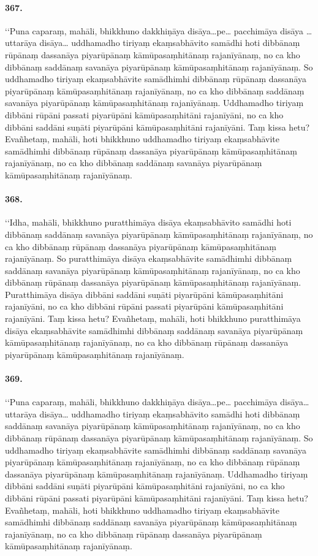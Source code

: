 \paragraph{367.} ‘‘Puna caparaṃ, mahāli, bhikkhuno dakkhiṇāya disāya…pe… pacchimāya disāya … uttarāya disāya… uddhamadho tiriyaṃ ekaṃsabhāvito samādhi hoti dibbānaṃ rūpānaṃ dassanāya piyarūpānaṃ kāmūpasaṃhitānaṃ rajanīyānaṃ, no ca kho dibbānaṃ saddānaṃ savanāya piyarūpānaṃ kāmūpasaṃhitānaṃ rajanīyānaṃ. So uddhamadho tiriyaṃ ekaṃsabhāvite samādhimhi dibbānaṃ rūpānaṃ dassanāya piyarūpānaṃ kāmūpasaṃhitānaṃ rajanīyānaṃ, no ca kho dibbānaṃ saddānaṃ savanāya piyarūpānaṃ kāmūpasaṃhitānaṃ rajanīyānaṃ. Uddhamadho tiriyaṃ dibbāni rūpāni passati piyarūpāni kāmūpasaṃhitāni rajanīyāni, no ca kho dibbāni saddāni suṇāti piyarūpāni kāmūpasaṃhitāni rajanīyāni. Taṃ kissa hetu? Evañhetaṃ, mahāli, hoti bhikkhuno uddhamadho tiriyaṃ ekaṃsabhāvite samādhimhi dibbānaṃ rūpānaṃ dassanāya piyarūpānaṃ kāmūpasaṃhitānaṃ rajanīyānaṃ, no ca kho dibbānaṃ saddānaṃ savanāya piyarūpānaṃ kāmūpasaṃhitānaṃ rajanīyānaṃ.

\paragraph{368.} ‘‘Idha, mahāli, bhikkhuno puratthimāya disāya ekaṃsabhāvito samādhi hoti dibbānaṃ saddānaṃ savanāya piyarūpānaṃ kāmūpasaṃhitānaṃ rajanīyānaṃ, no ca kho dibbānaṃ rūpānaṃ dassanāya piyarūpānaṃ kāmūpasaṃhitānaṃ rajanīyānaṃ. So puratthimāya disāya ekaṃsabhāvite samādhimhi dibbānaṃ saddānaṃ savanāya piyarūpānaṃ kāmūpasaṃhitānaṃ rajanīyānaṃ, no ca kho dibbānaṃ rūpānaṃ dassanāya piyarūpānaṃ kāmūpasaṃhitānaṃ rajanīyānaṃ. Puratthimāya disāya dibbāni saddāni suṇāti piyarūpāni kāmūpasaṃhitāni rajanīyāni, no ca kho dibbāni rūpāni passati piyarūpāni kāmūpasaṃhitāni rajanīyāni. Taṃ kissa hetu? Evañhetaṃ, mahāli, hoti bhikkhuno puratthimāya disāya ekaṃsabhāvite samādhimhi dibbānaṃ saddānaṃ savanāya piyarūpānaṃ kāmūpasaṃhitānaṃ rajanīyānaṃ, no ca kho dibbānaṃ rūpānaṃ dassanāya piyarūpānaṃ kāmūpasaṃhitānaṃ rajanīyānaṃ.

\paragraph{369.} ‘‘Puna caparaṃ, mahāli, bhikkhuno dakkhiṇāya disāya…pe… pacchimāya disāya… uttarāya disāya… uddhamadho tiriyaṃ ekaṃsabhāvito samādhi hoti dibbānaṃ saddānaṃ savanāya piyarūpānaṃ kāmūpasaṃhitānaṃ rajanīyānaṃ, no ca kho dibbānaṃ rūpānaṃ dassanāya piyarūpānaṃ kāmūpasaṃhitānaṃ rajanīyānaṃ. So uddhamadho tiriyaṃ ekaṃsabhāvite samādhimhi dibbānaṃ saddānaṃ savanāya piyarūpānaṃ kāmūpasaṃhitānaṃ rajanīyānaṃ, no ca kho dibbānaṃ rūpānaṃ dassanāya piyarūpānaṃ kāmūpasaṃhitānaṃ rajanīyānaṃ. Uddhamadho tiriyaṃ dibbāni saddāni suṇāti piyarūpāni kāmūpasaṃhitāni rajanīyāni, no ca kho dibbāni rūpāni passati piyarūpāni kāmūpasaṃhitāni rajanīyāni. Taṃ kissa hetu? Evañhetaṃ, mahāli, hoti bhikkhuno uddhamadho tiriyaṃ ekaṃsabhāvite samādhimhi dibbānaṃ saddānaṃ savanāya piyarūpānaṃ kāmūpasaṃhitānaṃ rajanīyānaṃ, no ca kho dibbānaṃ rūpānaṃ dassanāya piyarūpānaṃ kāmūpasaṃhitānaṃ rajanīyānaṃ.

